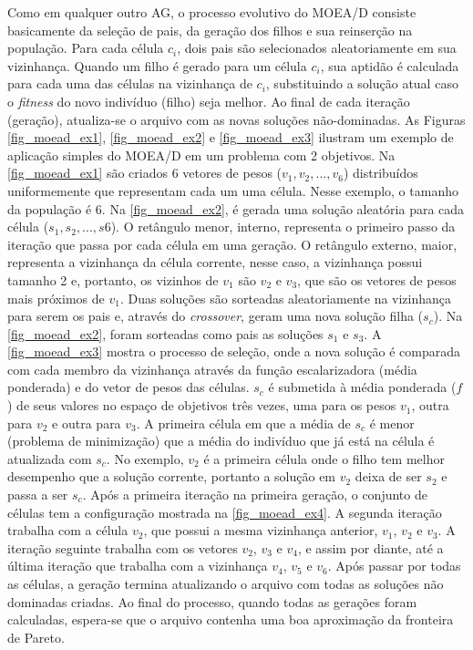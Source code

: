 Como em qualquer outro AG, o processo evolutivo do MOEA/D consiste basicamente da seleção de pais, da geração dos filhos e sua reinserção na população. Para cada célula $c_i$, dois pais são selecionados aleatoriamente em sua vizinhança. Quando um filho é gerado para um célula $c_i$, sua aptidão é calculada para cada uma das células na vizinhança de $c_i$, substituindo a solução atual caso o \textit{fitness} do novo indivíduo (filho) seja melhor. Ao final de cada iteração (geração), atualiza-se o arquivo com as novas soluções não-dominadas. As Figuras \ref{fig_moead_ex1}, \ref{fig_moead_ex2} e \ref{fig_moead_ex3} ilustram um exemplo de aplicação simples do MOEA/D em um problema com 2 objetivos. Na \autoref{fig_moead_ex1} são criados 6 vetores de pesos ($v_1, v_2, ..., v_6$) distribuídos uniformemente que representam cada um uma célula. Nesse exemplo, o tamanho da população é 6. Na \autoref{fig_moead_ex2}, é gerada uma solução aleatória para cada célula ($s_1, s_2, ..., s6$). O retângulo menor, interno, representa o primeiro passo da iteração que passa por cada célula em uma geração. O retângulo externo, maior, representa a vizinhança da célula corrente, nesse caso, a vizinhança possui tamanho 2 e, portanto, os vizinhos de $v_1$ são $v_2$ e $v_3$, que são os vetores de pesos mais próximos de $v_1$. Duas soluções são sorteadas aleatoriamente na vizinhança para serem os pais e, através do \textit{crossover}, geram uma nova solução filha ($s_c$). Na \autoref{fig_moead_ex2}, foram sorteadas como pais as soluções $s_1$ e $s_3$. A \autoref{fig_moead_ex3} mostra o processo de seleção, onde a nova solução é comparada com cada membro da vizinhança através da função escalarizadora (média ponderada) e do vetor de pesos das células. $s_c$ é submetida à média ponderada ($f$) de seus valores no espaço de objetivos três vezes, uma para os pesos $v_1$, outra para $v_2$ e outra para $v_3$. A primeira célula em que a média de $s_c$ é menor (problema de minimização) que a média do indivíduo que já está na célula é atualizada com $s_c$. No exemplo, $v_2$ é a primeira célula onde o filho tem melhor desempenho que a solução corrente, portanto a solução em $v_2$ deixa de ser $s_2$ e passa a ser $s_c$. Após a primeira iteração na primeira geração, o conjunto de células tem a configuração mostrada na  \autoref{fig_moead_ex4}. A segunda iteração trabalha com a célula $v_2$, que possui a mesma vizinhança anterior, $v_1$, $v_2$ e $v_3$. A iteração seguinte trabalha com os vetores $v_2$, $v_3$ e $v_4$, e assim por diante, até a última iteração que trabalha com a vizinhança $v_4$, $v_5$ e $v_6$. Após passar por todas as células, a geração termina atualizando o arquivo com todas as soluções não dominadas criadas. Ao final do processo, quando todas as gerações foram calculadas, espera-se que o arquivo contenha uma boa aproximação da fronteira de Pareto.

